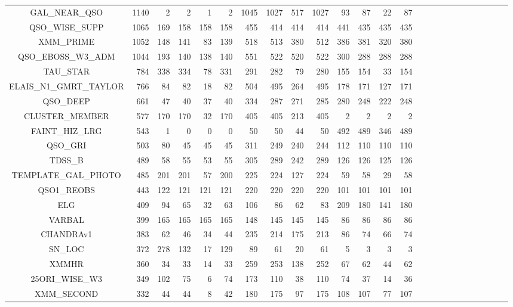 \documentclass[onecolumn]{aa}
\begin{document}
\begin{landscape}
\begin{center}
\begin{longtable}{c r rrrr rrrr rrrrr rrrrr rrrrr}
GAL\_NEAR\_QSO 			 & 1140 & 2 & 2 & 1 & 2 & 1045 & 1027 & 517 & 1027 & 93 & 87 & 22 & 87 \\ 
QSO\_WISE\_SUPP 		 & 1065 & 169 & 158 & 158 & 158 & 455 & 414 & 414 & 414 & 441 & 435 & 435 & 435 \\ 
XMM\_PRIME & 1052 		 & 148 & 141 & 83 & 139 & 518 & 513 & 380 & 512 & 386 & 381 & 320 & 380 \\ 
QSO\_EBOSS\_W3\_ADM	 	 & 1044 & 193 & 140 & 138 & 140 & 551 & 522 & 520 & 522 & 300 & 288 & 288 & 288 \\ 
TAU\_STAR 			 	 & 784 & 338 & 334 & 78 & 331 & 291 & 282 & 79 & 280 & 155 & 154 & 33 & 154 \\ 
ELAIS\_N1\_GMRT\_TAYLOR  & 766 & 84 & 82 & 18 & 82 & 504 & 495 & 264 & 495 & 178 & 171 & 127 & 171 \\ 
QSO\_DEEP 				 & 661 & 47 & 40 & 37 & 40 & 334 & 287 & 271 & 285 & 280 & 248 & 222 & 248 \\ 
CLUSTER\_MEMBER 		 & 577 & 170 & 170 & 32 & 170 & 405 & 405 & 213 & 405 & 2 & 2 & 2 & 2 \\ 
FAINT\_HIZ\_LRG 		 & 543 & 1 & 0 & 0 & 0 & 50 & 50 & 44 & 50 & 492 & 489 & 346 & 489 \\ 
QSO\_GRI & 503 & 80 & 45 & 45 & 45 & 311 & 249 & 240 & 244 & 112 & 110 & 110 & 110 \\ 
TDSS\_B & 489 & 58 & 55 & 53 & 55 & 305 & 289 & 242 & 289 & 126 & 126 & 125 & 126 \\ 
TEMPLATE\_GAL\_PHOTO & 485 & 201 & 201 & 57 & 200 & 225 & 224 & 127 & 224 & 59 & 58 & 29 & 58 \\ 
QSO1\_REOBS & 443 & 122 & 121 & 121 & 121 & 220 & 220 & 220 & 220 & 101 & 101 & 101 & 101 \\ 
ELG & 409 & 94 & 65 & 32 & 63 & 106 & 86 & 62 & 83 & 209 & 180 & 141 & 180 \\ 
VARBAL & 399 & 165 & 165 & 165 & 165 & 148 & 145 & 145 & 145 & 86 & 86 & 86 & 86 \\ 
CHANDRAv1 & 383 & 62 & 46 & 34 & 44 & 235 & 214 & 175 & 213 & 86 & 74 & 66 & 74 \\ 
SN\_LOC & 372 & 278 & 132 & 17 & 129 & 89 & 61 & 20 & 61 & 5 & 3 & 3 & 3 \\ 
XMMHR & 360 & 34 & 33 & 14 & 33 & 259 & 253 & 138 & 252 & 67 & 62 & 44 & 62 \\ 
25ORI\_WISE\_W3 & 349 & 102 & 75 & 6 & 74 & 173 & 110 & 38 & 110 & 74 & 37 & 14 & 36 \\ 
XMM\_SECOND & 332 & 44 & 44 & 8 & 42 & 180 & 175 & 97 & 175 & 108 & 107 & 77 & 107 \\ 

\end{longtable}
\end{center}
\end{landscape}
\end{document}
